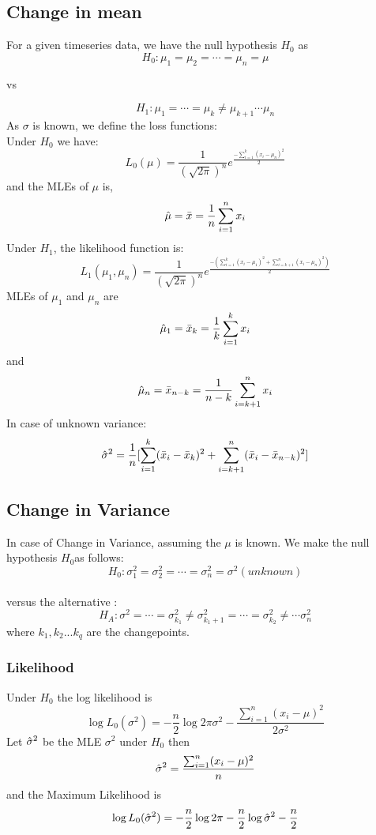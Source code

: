 \documentclass{article}
\begin{document}
\subsection{Change in mean}
For a given timeseries data, we have the null hypothesis $H_{0}$ as
$$H_{0} : \mu_{1} = \mu_{2} = \cdots = \mu_{n} = \mu$$
\begin{center}
    vs
\end{center}  
$$H_{1} : \mu_{1} = \cdots = \mu_{k} \neq \mu_{k+1} \cdots \mu_{n}$$
As $\sigma$ is known, we define the loss functions:\\
Under $H_{0}$ we have: \\
$$L_{0}(\mu) = \frac{1}{(\sqrt{2\pi})^{n}} e^{\frac{-\sum_{i=1}^{k} (x_{i} - \mu_{n})^{2}}{2}}$$
and the MLEs of $\mu$ is,
$$\hat{\mu} = \Bar{x} =\frac{1}{n} \sum_{i=1}^{n} x_{i}$$
Under $H_{1}$, the likelihood function is: \\
$$L_{1} (\mu_{1},\mu_{n}) = \frac{1}{(\sqrt{2\pi})^{n}} e^{\frac{-(\sum_{i=1}^{k} (x_{i} - \mu_{1})^{2} + \sum_{i=k+1}^{n} (x_{i} - \mu_{n})^{2})}{2}}$$
MLEs of $\mu_{1}$ and $\mu_{n}$ are
$$\hat{\mu}_{1} = \Bar{x}_{k} = \frac{1}{k}\sum_{i=1}^{k} x_{i}$$
and
$$\hat{\mu}_{n} = \Bar{x}_{n-k} = \frac{1}{n-k}\sum_{i=k+1}^{n}x_{i}$$
In case of unknown variance:
$$\hat{\sigma}^{2} = \frac{1}{n}[\sum_{i=1}^{k} (\Bar{x}_{i} - \Bar{x}_{k})^{2} + \sum_{i=k+1}^{n} (\Bar{x}_{i} - \Bar{x}_{n-k})^{2} ]$$
\subsection{Change in Variance}
In case of Change in Variance, assuming the $\mu$ is known. We make the null hypothesis $H_{0}$as follows:
$$ H_{0} : \sigma^{2}_{1} = \sigma^{2}_{2} = \cdots = \sigma^{2}_{n} = \sigma^{2} (unknown) $$ \\
versus the alternative :\\ 
$$H_{A} : \sigma^{2} = \cdots = \sigma^{2}_{k_{1}} \neq \sigma^{2}_{k_{1}+1} = \cdots = \sigma^{2}_{k_{2}} \neq \cdots \sigma^{2}_{n}$$
where $k_{1},k_{2}... k_{q}$ are the changepoints.\\
\subsubsection{Likelihood}
Under $H_{0}$ the log likelihood is 
$$ \log L_{0}(\sigma^{2}) = -\frac{n}{2} \log 2\pi\sigma^{2} - \frac{\sum_{i=1}^{n} (x_{i} - \mu)^{2}}{2\sigma^{2}}$$
Let $\Hat{\sigma}^{2}$ be the MLE $\sigma^{2}$ under $H_{0}$ then
$$\Hat{\sigma}^{2} = \frac{\sum^{n}_{i=1}(x_{i} - \mu)^{2}}{n}$$
and the Maximum Likelihood is
\begin{equation}
    \log L_{0}(\Hat{\sigma}^{2}) = -\frac{n}{2}\log 2\pi -\frac{n}{2} \log \Hat{\sigma}^{2} -\frac{n}{2}
\end{equation}
\end{document}
